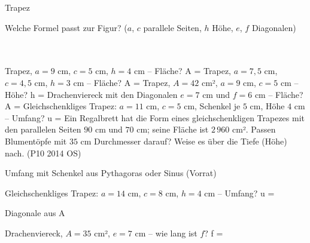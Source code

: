 \setcounter{aufgabe}{21}

\begin{aufgabe}{Trapez}
\begin{teile}
\teil Welche Formel passt zur Figur? ($a$, $c$ parallele Seiten, $h$ Höhe, $e$, $f$ Diagonalen) \\  \\  \\ 

\teil Trapez, $a = 9$ cm, $c = 5$ cm, $h = 4$ cm – Fläche? A = \leerfeld[cm²]
\teil Trapez, $a = 7{,}5$ cm, $c = 4{,}5$ cm, $h = 3$ cm – Fläche? A = \leerfeld[cm²]
\teil Trapez, $A = 42$ cm², $a = 9$ cm, $c = 5$ cm – Höhe? h = \leerfeld[cm]
\teil Drachenviereck mit den Diagonalen $e = 7$ cm und $f = 6$ cm – Fläche? A = \leerfeld[cm²]
\teil Gleichschenkliges Trapez: $a = 11$ cm, $c = 5$ cm, Schenkel je $5$ cm, Höhe $4$ cm – Umfang? u = \leerfeld[cm]
\teil Ein Regalbrett hat die Form eines gleichschenkligen Trapezes mit den parallelen Seiten $90$ cm und $70$ cm; seine Fläche ist $2\,960$ cm². Passen Blumentöpfe mit $35$ cm Durchmesser darauf? Weise es über die Tiefe (Höhe) nach. \hfill (P10 2014 OS)
\end{teile}
\end{aufgabe}

\begin{aufgabe}{Umfang mit Schenkel aus Pythagoras oder Sinus (Vorrat)}
\begin{teile}
\teil Gleichschenkliges Trapez: $a = 14$ cm, $c = 8$ cm, $h = 4$ cm – Umfang? u = \leerfeld[cm]
\end{teile}
\end{aufgabe}

\begin{aufgabe}{Diagonale aus A}
\begin{teile}
\teil Drachenviereck, $A = 35$ cm², $e = 7$ cm – wie lang ist $f$? f = \leerfeld[cm]
\end{teile}
\end{aufgabe}

